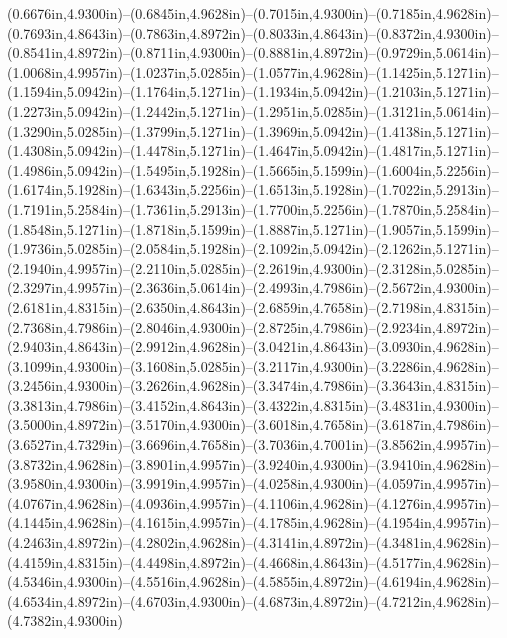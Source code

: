 (0.6676in,4.9300in)--(0.6845in,4.9628in)--(0.7015in,4.9300in)--(0.7185in,4.9628in)--(0.7693in,4.8643in)--(0.7863in,4.8972in)--(0.8033in,4.8643in)--(0.8372in,4.9300in)--(0.8541in,4.8972in)--(0.8711in,4.9300in)--(0.8881in,4.8972in)--(0.9729in,5.0614in)--(1.0068in,4.9957in)--(1.0237in,5.0285in)--(1.0577in,4.9628in)--(1.1425in,5.1271in)--(1.1594in,5.0942in)--(1.1764in,5.1271in)--(1.1934in,5.0942in)--(1.2103in,5.1271in)--(1.2273in,5.0942in)--(1.2442in,5.1271in)--(1.2951in,5.0285in)--(1.3121in,5.0614in)--(1.3290in,5.0285in)--(1.3799in,5.1271in)--(1.3969in,5.0942in)--(1.4138in,5.1271in)--(1.4308in,5.0942in)--(1.4478in,5.1271in)--(1.4647in,5.0942in)--(1.4817in,5.1271in)--(1.4986in,5.0942in)--(1.5495in,5.1928in)--(1.5665in,5.1599in)--(1.6004in,5.2256in)--(1.6174in,5.1928in)--(1.6343in,5.2256in)--(1.6513in,5.1928in)--(1.7022in,5.2913in)--(1.7191in,5.2584in)--(1.7361in,5.2913in)--(1.7700in,5.2256in)--(1.7870in,5.2584in)--(1.8548in,5.1271in)--(1.8718in,5.1599in)--(1.8887in,5.1271in)--(1.9057in,5.1599in)--(1.9736in,5.0285in)--(2.0584in,5.1928in)--(2.1092in,5.0942in)--(2.1262in,5.1271in)--(2.1940in,4.9957in)--(2.2110in,5.0285in)--(2.2619in,4.9300in)--(2.3128in,5.0285in)--(2.3297in,4.9957in)--(2.3636in,5.0614in)--(2.4993in,4.7986in)--(2.5672in,4.9300in)--(2.6181in,4.8315in)--(2.6350in,4.8643in)--(2.6859in,4.7658in)--(2.7198in,4.8315in)--(2.7368in,4.7986in)--(2.8046in,4.9300in)--(2.8725in,4.7986in)--(2.9234in,4.8972in)--(2.9403in,4.8643in)--(2.9912in,4.9628in)--(3.0421in,4.8643in)--(3.0930in,4.9628in)--(3.1099in,4.9300in)--(3.1608in,5.0285in)--(3.2117in,4.9300in)--(3.2286in,4.9628in)--(3.2456in,4.9300in)--(3.2626in,4.9628in)--(3.3474in,4.7986in)--(3.3643in,4.8315in)--(3.3813in,4.7986in)--(3.4152in,4.8643in)--(3.4322in,4.8315in)--(3.4831in,4.9300in)--(3.5000in,4.8972in)--(3.5170in,4.9300in)--(3.6018in,4.7658in)--(3.6187in,4.7986in)--(3.6527in,4.7329in)--(3.6696in,4.7658in)--(3.7036in,4.7001in)--(3.8562in,4.9957in)--(3.8732in,4.9628in)--(3.8901in,4.9957in)--(3.9240in,4.9300in)--(3.9410in,4.9628in)--(3.9580in,4.9300in)--(3.9919in,4.9957in)--(4.0258in,4.9300in)--(4.0597in,4.9957in)--(4.0767in,4.9628in)--(4.0936in,4.9957in)--(4.1106in,4.9628in)--(4.1276in,4.9957in)--(4.1445in,4.9628in)--(4.1615in,4.9957in)--(4.1785in,4.9628in)--(4.1954in,4.9957in)--(4.2463in,4.8972in)--(4.2802in,4.9628in)--(4.3141in,4.8972in)--(4.3481in,4.9628in)--(4.4159in,4.8315in)--(4.4498in,4.8972in)--(4.4668in,4.8643in)--(4.5177in,4.9628in)--(4.5346in,4.9300in)--(4.5516in,4.9628in)--(4.5855in,4.8972in)--(4.6194in,4.9628in)--(4.6534in,4.8972in)--(4.6703in,4.9300in)--(4.6873in,4.8972in)--(4.7212in,4.9628in)--(4.7382in,4.9300in) 